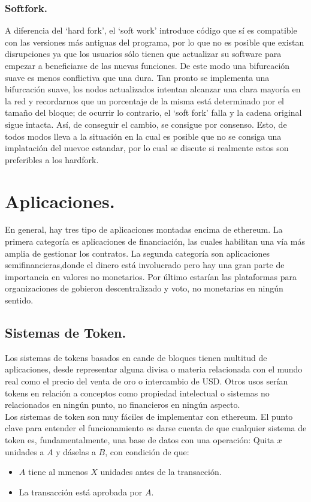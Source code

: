 \documentclass[11pt,a4paper]{article}
\begin{document}
\subsubsection{Softfork.}
A diferencia del ‘hard fork’, el ‘soft work’ introduce código que sí es compatible con las versiones más antiguas del programa, por lo que no es posible que existan disrupciones ya que los usuarios sólo tienen que actualizar su software para empezar a beneficiarse de las nuevas funciones. De este modo una bifurcación suave es menos conflictiva que una dura.  Tan pronto se implementa una bifurcación suave, los nodos actualizados intentan alcanzar una clara mayoría en la red y recordarnos que un porcentaje de la misma está determinado por el tamaño del bloque; de ocurrir lo contrario, el ‘soft fork’ falla y la cadena original sigue intacta. Así, de conseguir el cambio, se consigue por consenso. Esto, de todos modos lleva a la situación en la cual es posible que no se consiga una implatación del nuevoe estandar, por lo cual se discute si realmente estos son preferibles a los hardfork.

\section {Aplicaciones.} 
En general, hay tres tipo de aplicaciones montadas encima de ethereum. La primera categoría es aplicaciones de financiación, las cuales habilitan una vía más amplia de gestionar los contratos. La segunda categoría son aplicaciones semifinancieras,donde el dinero está involucrado pero hay una gran parte de importancia en valores no monetarios. Por último estarían las plataformas para organizaciones de gobieron descentralizado y voto, no monetarias en ningún sentido.

\subsection{Sistemas de Token.}

Los sistemas de tokens basados en cande de bloques tienen multitud de aplicaciones, desde representar alguna divisa o materia relacionada con el mundo real como el precio del venta de oro o intercambio de USD. Otros usos serían tokens en relación a conceptos como propiedad intelectual o sistemas no relacionados en ningún punto, no financieros en ningún aspecto. \\

Los sistemas de token son muy fáciles de implementar con ethereum. El punto clave para entender el funcionamiento es darse cuenta de que cualquier sistema de token es, fundamentalmente, una base de datos con una operación: Quita $x$ unidades a $A$ y dáselas a $B$, con condición de que:
\begin{itemize}
\item $A$ tiene al mmenos $X$ unidades antes de la transacción.
\item La transacción está aprobada por $A$. 
\end{itemize}
\end{document}
